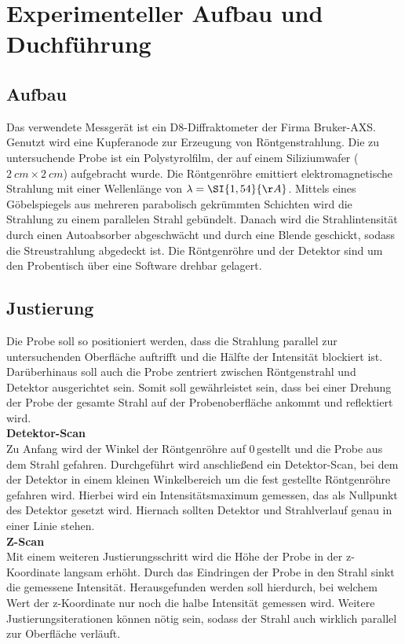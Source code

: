 \section{Experimenteller Aufbau und Duchführung}
\subsection{Aufbau}
Das verwendete Messgerät ist ein D8-Diffraktometer der Firma Bruker-AXS. Genutzt wird eine Kupferanode zur Erzeugung von Röntgenstrahlung.
Die zu untersuchende Probe ist ein Polystyrolfilm, der auf einem Siliziumwafer ($\SI{2}{cm}\times\SI{2}{cm}$) aufgebracht wurde. Die Röntgenröhre emittiert elektromagnetische Strahlung mit einer Wellenlänge von $\lambda=\SI{1,54}{\AA}$.
Mittels eines Göbelspiegels aus mehreren parabolisch gekrümmten Schichten wird die Strahlung zu einem parallelen Strahl gebündelt.
Danach wird die Strahlintensität durch einen Autoabsorber abgeschwächt und durch eine Blende geschickt, sodass die Streustrahlung abgedeckt ist. Die Röntgenröhre und der Detektor sind um den Probentisch über eine Software drehbar gelagert.
\subsection{Justierung}
Die Probe soll so positioniert werden, dass die Strahlung parallel zur untersuchenden Oberfläche auftrifft und die Hälfte der Intensität blockiert ist. Darüberhinaus soll auch die Probe zentriert zwischen Röntgenstrahl und Detektor ausgerichtet sein. Somit soll gewährleistet sein, dass bei einer Drehung der Probe der gesamte Strahl auf der Probenoberfläche ankommt und reflektiert wird.\\

\textbf{Detektor-Scan}\\
Zu Anfang wird der Winkel der Röntgenröhre auf 0\textdegree\,gestellt und die Probe aus dem Strahl gefahren. Durchgeführt wird anschließend ein Detektor-Scan, bei dem der Detektor in einem kleinen Winkelbereich um die fest gestellte Röntgenröhre gefahren wird. Hierbei wird ein Intensitätsmaximum gemessen, das als Nullpunkt des Detektor gesetzt wird. Hiernach sollten Detektor und Strahlverlauf genau in einer Linie stehen.\\

\textbf{Z-Scan}\\
Mit einem weiteren Justierungsschritt wird die Höhe der Probe in der z-Koordinate langsam erhöht. Durch das Eindringen der Probe in den Strahl sinkt die gemessene Intensität. Herausgefunden werden soll hierdurch, bei welchem Wert der z-Koordinate nur noch die halbe Intensität gemessen wird. Weitere Justierungsiterationen können nötig sein, sodass der Strahl auch wirklich parallel zur Oberfläche verläuft.\\

